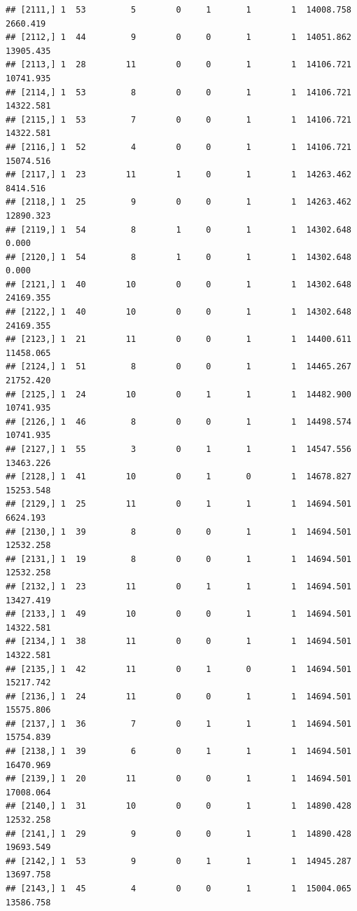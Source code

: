 \documentclass[
]{article}
\begin{document}
\begin{verbatim}
## [2111,] 1  53         5        0     1       1        1  14008.758   2660.419
## [2112,] 1  44         9        0     0       1        1  14051.862  13905.435
## [2113,] 1  28        11        0     0       1        1  14106.721  10741.935
## [2114,] 1  53         8        0     0       1        1  14106.721  14322.581
## [2115,] 1  53         7        0     0       1        1  14106.721  14322.581
## [2116,] 1  52         4        0     0       1        1  14106.721  15074.516
## [2117,] 1  23        11        1     0       1        1  14263.462   8414.516
## [2118,] 1  25         9        0     0       1        1  14263.462  12890.323
## [2119,] 1  54         8        1     0       1        1  14302.648      0.000
## [2120,] 1  54         8        1     0       1        1  14302.648      0.000
## [2121,] 1  40        10        0     0       1        1  14302.648  24169.355
## [2122,] 1  40        10        0     0       1        1  14302.648  24169.355
## [2123,] 1  21        11        0     0       1        1  14400.611  11458.065
## [2124,] 1  51         8        0     0       1        1  14465.267  21752.420
## [2125,] 1  24        10        0     1       1        1  14482.900  10741.935
## [2126,] 1  46         8        0     0       1        1  14498.574  10741.935
## [2127,] 1  55         3        0     1       1        1  14547.556  13463.226
## [2128,] 1  41        10        0     1       0        1  14678.827  15253.548
## [2129,] 1  25        11        0     1       1        1  14694.501   6624.193
## [2130,] 1  39         8        0     0       1        1  14694.501  12532.258
## [2131,] 1  19         8        0     0       1        1  14694.501  12532.258
## [2132,] 1  23        11        0     1       1        1  14694.501  13427.419
## [2133,] 1  49        10        0     0       1        1  14694.501  14322.581
## [2134,] 1  38        11        0     0       1        1  14694.501  14322.581
## [2135,] 1  42        11        0     1       0        1  14694.501  15217.742
## [2136,] 1  24        11        0     0       1        1  14694.501  15575.806
## [2137,] 1  36         7        0     1       1        1  14694.501  15754.839
## [2138,] 1  39         6        0     1       1        1  14694.501  16470.969
## [2139,] 1  20        11        0     0       1        1  14694.501  17008.064
## [2140,] 1  31        10        0     0       1        1  14890.428  12532.258
## [2141,] 1  29         9        0     0       1        1  14890.428  19693.549
## [2142,] 1  53         9        0     1       1        1  14945.287  13697.758
## [2143,] 1  45         4        0     0       1        1  15004.065  13586.758

\end{verbatim}
\end{document}

